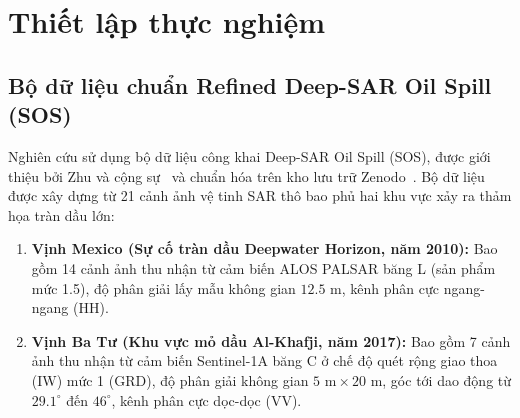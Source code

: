 \section{Thiết lập thực nghiệm}
\label{sec:experiments}

\subsection{Bộ dữ liệu chuẩn Refined Deep-SAR Oil Spill (SOS)}
\label{subsec:dataset}
Nghiên cứu sử dụng bộ dữ liệu công khai Deep-SAR Oil Spill (SOS), được giới thiệu bởi Zhu và cộng sự~\cite{zhu2022oil} và chuẩn hóa trên kho lưu trữ Zenodo~\cite{zuenko2025refined}. Bộ dữ liệu được xây dựng từ 21 cảnh ảnh vệ tinh SAR thô bao phủ hai khu vực xảy ra thảm họa tràn dầu lớn:
\begin{enumerate}
    \item \textbf{Vịnh Mexico (Sự cố tràn dầu Deepwater Horizon, năm 2010):} Bao gồm 14 cảnh ảnh thu nhận từ cảm biến ALOS PALSAR băng L (sản phẩm mức 1.5), độ phân giải lấy mẫu không gian $12.5\text{ m}$, kênh phân cực ngang-ngang (HH).
    \item \textbf{Vịnh Ba Tư (Khu vực mỏ dầu Al-Khafji, năm 2017):} Bao gồm 7 cảnh ảnh thu nhận từ cảm biến Sentinel-1A băng C ở chế độ quét rộng giao thoa (IW) mức 1 (GRD), độ phân giải không gian $5\text{ m} \times 20\text{ m}$, góc tới dao động từ $29.1^\circ$ đến $46^\circ$, kênh phân cực dọc-dọc (VV).
\end{enumerate}

\begin{table}[!t]
\centering
\caption{Thống kê cấu trúc phân chia bộ dữ liệu Refined Deep-SAR Oil Spill (SOS).}
\label{tab:dataset_stats}
\end{table}

